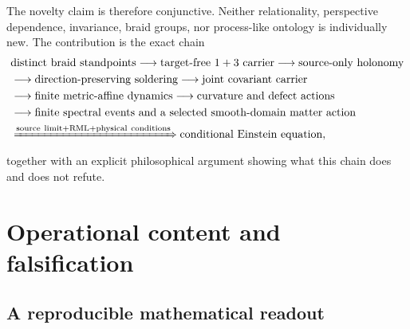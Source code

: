 \documentclass[11pt]{article}
\theoremstyle{definition}
\theoremstyle{remark}
\begin{document}
The novelty claim is therefore conjunctive. Neither relationality, perspective dependence, invariance, braid groups, nor process-like ontology is individually new. The contribution is the exact chain
\begin{equation}\label{eq:novelchain}
\begin{aligned}
&\text{distinct braid standpoints}
\longrightarrow\text{target-free $1+3$ carrier}
\longrightarrow\text{source-only holonomy}\\
&\longrightarrow\text{direction-preserving soldering}
\longrightarrow\text{joint covariant carrier}\\
&\longrightarrow\text{finite metric-affine dynamics}
\longrightarrow\text{curvature and defect actions}\\
&\longrightarrow\text{finite spectral events and a selected smooth-domain matter action}\\
&\xRightarrow{\mathrm{source\ limit+RML+physical\ conditions}}
 \text{conditional Einstein equation},
\end{aligned}
\end{equation}
together with an explicit philosophical argument showing what this chain does and does not refute.

\section{Operational content and falsification}

\subsection{A reproducible mathematical readout}
\end{document}
